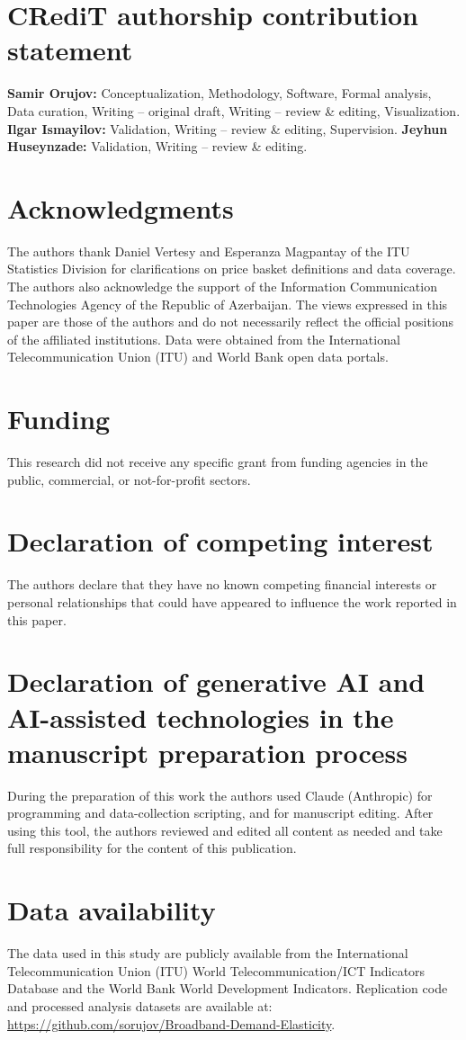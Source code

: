\documentclass[preprint,review,12pt,authoryear]{styles/elsarticle}
\begin{document}
\section*{CRediT authorship contribution statement}
\textbf{Samir Orujov:} Conceptualization, Methodology, Software, Formal
analysis, Data curation, Writing -- original draft, Writing -- review \&
editing, Visualization.
\textbf{Ilgar Ismayilov:} Validation, Writing -- review \& editing, Supervision.
\textbf{Jeyhun Huseynzade:} Validation, Writing -- review \& editing.

\section*{Acknowledgments}
The authors thank Daniel Vertesy and Esperanza Magpantay of the ITU Statistics
Division for clarifications on price basket definitions and data coverage. The
authors also acknowledge the support of the Information Communication
Technologies Agency of the Republic of Azerbaijan. The views expressed in this
paper are those of the authors and do not necessarily reflect the official
positions of the affiliated institutions. Data were obtained from the International
Telecommunication Union (ITU) and World Bank open data portals.

\section*{Funding}
This research did not receive any specific grant from funding agencies in the
public, commercial, or not-for-profit sectors.

\section*{Declaration of competing interest}
The authors declare that they have no known competing financial interests or
personal relationships that could have appeared to influence the work reported
in this paper.

\section*{Declaration of generative AI and AI-assisted technologies in the
manuscript preparation process}
During the preparation of this work the authors used Claude (Anthropic) for
programming and data-collection scripting, and for manuscript editing. After
using this tool, the authors reviewed and edited all content as needed and take
full responsibility for the content of this publication.

\section*{Data availability}
The data used in this study are publicly available from the International
Telecommunication Union (ITU) World Telecommunication/ICT Indicators Database
and the World Bank World Development Indicators. Replication code and processed
analysis datasets are available at:
\url{https://github.com/sorujov/Broadband-Demand-Elasticity}.
\end{document}
